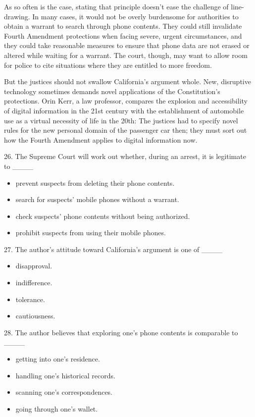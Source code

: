 \documentclass[UTF8,11pt]{ctexart}
\begin{document}
As so often is the case, stating that principle doesn’t ease the challenge of line-drawing. In many cases, it would not be overly burdensome for authorities to obtain a warrant to search through phone contents. They could still invalidate Fourth Amendment protections when facing severe, urgent circumstances, and they could take reasonable measures to ensure that phone data are not erased or altered while waiting for a warrant. The court, though, may want to allow room for police to cite situations where they are entitled to more freedom.


But the justices should not swallow California’s argument whole. New, disruptive technology sometimes demands novel applications of the Constitution’s protections. Orin Kerr, a law professor, compares the explosion and accessibility of digital information in the 21st century with the establishment of automobile use as a virtual necessity of life in the 20th: The justices had to specify novel rules for the new personal domain of the passenger car then; they must sort out how the Fourth Amendment applies to digital information now.


26. The Supreme Court will work out whether, during an arrest, it is legitimate to \_\_\_\_


\begin{itemize}[leftmargin=2em,itemsep=.2em,topsep=.4em]\item[A.] prevent suspects from deleting their phone contents.
\item[B.] search for suspects’ mobile phones without a warrant.
\item[C.] check suspects’ phone contents without being authorized.
\item[D.] prohibit suspects from using their mobile phones.
\end{itemize}

27. The author’s attitude toward California’s argument is one of \_\_\_\_


\begin{itemize}[leftmargin=2em,itemsep=.2em,topsep=.4em]\item[A.] disapproval.
\item[B.] indifference.
\item[C.] tolerance.
\item[D.] cautiousness.
\end{itemize}

28. The author believes that exploring one’s phone contents is comparable to \_\_\_\_


\begin{itemize}[leftmargin=2em,itemsep=.2em,topsep=.4em]\item[A.] getting into one’s residence.
\item[B.] handling one’s historical records.
\item[C.] scanning one’s correspondences.
\item[D.] going through one’s wallet.
\end{itemize}
\end{document}
